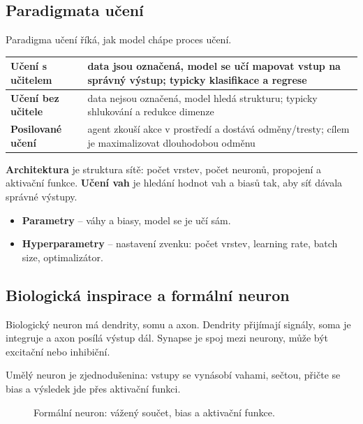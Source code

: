 \subsection*{Paradigmata učení}
Paradigma učení říká, jak model chápe proces učení.

\begin{center}
    \begin{tabularx}{\textwidth}{|l|X|}
        \hline
        \textbf{Učení s učitelem}  & data jsou označená, model se učí mapovat vstup na správný výstup; typicky klasifikace a regrese  \\
        \hline
        \textbf{Učení bez učitele} & data nejsou označená, model hledá strukturu; typicky shlukování a redukce dimenze                \\
        \hline
        \textbf{Posilované učení}  & agent zkouší akce v prostředí a dostává odměny/tresty; cílem je maximalizovat dlouhodobou odměnu \\
        \hline
    \end{tabularx}
\end{center}

\textbf{Architektura} je struktura sítě: počet vrstev, počet neuronů, propojení a aktivační funkce. \textbf{Učení vah} je hledání hodnot vah a biasů tak, aby síť dávala správné výstupy.

\begin{itemize}
    \item \textbf{Parametry} -- váhy a biasy, model se je učí sám.
    \item \textbf{Hyperparametry} -- nastavení zvenku: počet vrstev, learning rate, batch size, optimalizátor.
\end{itemize}

\subsection*{Biologická inspirace a formální neuron}
Biologický neuron má dendrity, somu a axon. Dendrity přijímají signály, soma je
integruje a axon posílá výstup dál. Synapse je spoj mezi neurony, může být
excitační nebo inhibiční.

Umělý neuron je zjednodušenina: vstupy se vynásobí vahami, sečtou, přičte se
bias a výsledek jde přes aktivační funkci.

\begin{figure}[H]
    \centering
    \caption{Formální neuron: vážený součet, bias a aktivační funkce.}
\end{figure}

